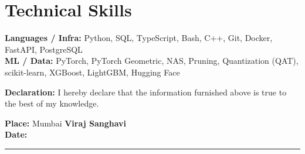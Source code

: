 \documentclass[10pt,a4paper]{article}
\begin{document}
\section{Technical Skills}
\textbf{Languages / Infra:} Python, SQL, TypeScript, Bash, C++, Git, Docker, FastAPI, PostgreSQL\\
\textbf{ML / Data:} PyTorch, PyTorch Geometric, NAS, Pruning, Quantization (QAT), scikit-learn, XGBoost, LightGBM, Hugging Face

\vfill
\textbf{Declaration:} I hereby declare that the information furnished above is true to the best of my knowledge.

\vspace{18pt}
\textbf{Place:} Mumbai \hfill \textbf{Viraj Sanghavi}\\[2pt]
\textbf{Date:} \rule{1.2in}{0.4pt}
\end{document}
